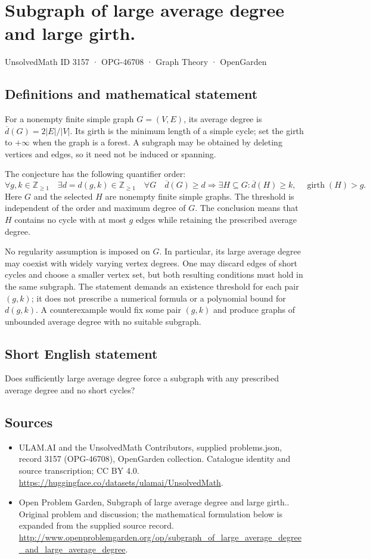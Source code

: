 \documentclass[11pt,a4paper]{article}
\begin{document}
\section*{Subgraph of large average degree and large girth.}\label{3157}
{\small UnsolvedMath ID 3157 · OPG-46708 · Graph Theory · OpenGarden}
\subsection{Definitions and mathematical statement}
For a nonempty finite simple graph $G=(V,E)$, its average degree
is $\overline d(G)=2|E|/|V|$. Its girth is the minimum length of
a simple cycle; set the girth to $+\infty$ when the graph is a
forest. A subgraph may be obtained by deleting vertices and
edges, so it need not be induced or spanning.

The conjecture has the following quantifier order:
\[
 \forall g,k\in\mathbb Z_{\geq1}\quad
 \exists d=d(g,k)\in\mathbb Z_{\geq1}\quad
 \forall G\quad
 \overline d(G)\geq d\Longrightarrow
 \exists H\subseteq G:
 \overline d(H)\geq k,\quad\operatorname{girth}(H)>g.
\]
Here $G$ and the selected $H$ are nonempty finite simple graphs.
The threshold is independent of the order and maximum degree
of $G$. The conclusion means that $H$ contains no cycle with at
most $g$ edges while retaining the prescribed average degree.

No regularity assumption is imposed on $G$. In particular, its
large average degree may coexist with widely varying vertex
degrees. One may discard edges of short cycles and choose a
smaller vertex set, but both resulting conditions must hold in
the same subgraph. The statement demands an existence threshold
for each pair $(g,k)$; it does not prescribe a numerical formula
or a polynomial bound for $d(g,k)$. A counterexample would fix
some pair $(g,k)$ and produce graphs of unbounded average degree
with no suitable subgraph.
\subsection{Short English statement}
Does sufficiently large average degree force a subgraph with any prescribed average degree and no short cycles?
\subsection{Sources}
\begin{itemize}
\item[S1] ULAM.AI and the UnsolvedMath Contributors, supplied problems.json, record 3157 (OPG-46708), OpenGarden collection. Catalogue identity and source transcription; CC BY 4.0.
\url{https://huggingface.co/datasets/ulamai/UnsolvedMath}.
\item[S2] Open Problem Garden, Subgraph of large average degree and large girth.. Original problem and discussion; the mathematical formulation below is expanded from the supplied source record.
\url{http://www.openproblemgarden.org/op/subgraph_of_large_average_degree_and_large_average_degree}.
\end{itemize}
\end{document}
